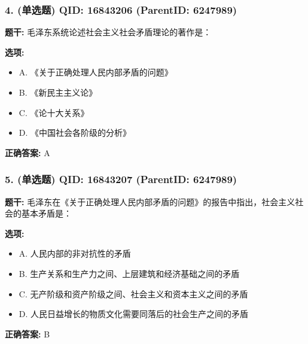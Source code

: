 \documentclass[12pt,UTF8]{ctexart}
\begin{document}
\subsubsection*{4. (单选题) \small QID: 16843206 (ParentID: 6247989)}

\textbf{题干:}
毛泽东系统论述社会主义社会矛盾理论的著作是：



\textbf{选项:}
\begin{itemize}[leftmargin=*]

  \item A. 《关于正确处理人民内部矛盾的问题》

  \item B. 《新民主主义论》

  \item C. 《论十大关系》

  \item D. 《中国社会各阶级的分析》

\end{itemize}

\textbf{正确答案:}
A

\vspace{0.3em}\hrulefill\vspace{0.7em}

\subsubsection*{5. (单选题) \small QID: 16843207 (ParentID: 6247989)}

\textbf{题干:}
毛泽东在《关于正确处理人民内部矛盾的问题》的报告中指出，社会主义社会的基本矛盾是：



\textbf{选项:}
\begin{itemize}[leftmargin=*]

  \item A. 人民内部的非对抗性的矛盾

  \item B. 生产关系和生产力之间、上层建筑和经济基础之间的矛盾

  \item C. 无产阶级和资产阶级之间、社会主义和资本主义之间的矛盾

  \item D. 人民日益增长的物质文化需要同落后的社会生产之间的矛盾

\end{itemize}

\textbf{正确答案:}
B
\end{document}
